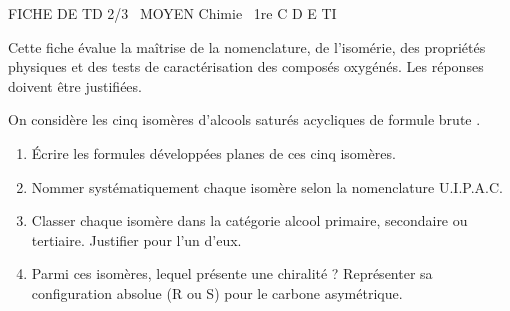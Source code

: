 \documentclass[11pt]{article}
\begin{document}
\begin{tcolorbox}[enhanced,colback=popink,colframe=popink,arc=10pt,boxrule=0pt,left=12pt,right=12pt,top=9pt,bottom=9pt]
{\color{white}\popxbold\small FICHE DE TD 2/3 \textbullet\ MOYEN \hfill Chimie \textbullet\ 1re C D E TI\par}
\end{tcolorbox}
\vspace{4pt}
\noindent Cette fiche évalue la maîtrise de la nomenclature, de l'isomérie, des propriétés physiques et des tests de caractérisation des composés oxygénés. Les réponses doivent être justifiées.

\begin{exercice}
On considère les cinq isomères d'alcools saturés acycliques de formule brute .
\begin{enumerate}
    \item Écrire les formules développées planes de ces cinq isomères.
    \item Nommer systématiquement chaque isomère selon la nomenclature U.I.P.A.C.
    \item Classer chaque isomère dans la catégorie alcool primaire, secondaire ou tertiaire. Justifier pour l'un d'eux.
    \item Parmi ces isomères, lequel présente une chiralité ? Représenter sa configuration absolue (R ou S) pour le carbone asymétrique.
\end{enumerate}
\end{exercice}
\end{document}
